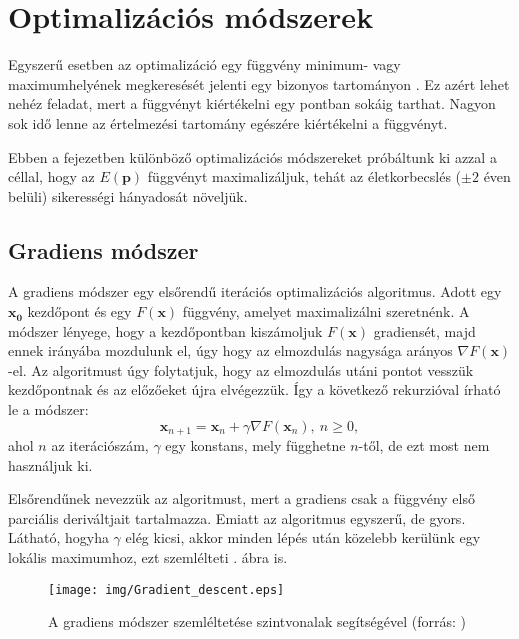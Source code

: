\documentclass[12pt]{article}
\begin{document}
\section{Optimalizációs módszerek}
Egyszerű esetben az optimalizáció egy függvény minimum- vagy maximumhelyének megkeresését jelenti egy bizonyos tartományon \cite{Holder}. Ez azért lehet nehéz feladat, mert a függvényt kiértékelni egy pontban sokáig tarthat. Nagyon sok idő lenne az értelmezési tartomány egészére kiértékelni a függvényt.

Ebben a fejezetben különböző optimalizációs módszereket próbáltunk ki azzal a céllal, hogy az $E(\mathbf{p})$ függvényt maximalizáljuk, tehát az életkorbecslés ($\pm 2$ éven belüli) sikerességi hányadosát növeljük.
\subsection{Gradiens módszer}
A gradiens módszer \cite{gradient1, gradient2} egy elsőrendű iterációs optimalizációs algoritmus. Adott egy $\mathbf{x_0}$ kezdőpont és egy $F(\mathbf{x})$ függvény, amelyet maximalizálni szeretnénk. A módszer lényege, hogy a kezdőpontban kiszámoljuk $F(\mathbf{x})$ gradiensét, majd ennek irányába mozdulunk el, úgy hogy az elmozdulás nagysága arányos $\nabla F(\mathbf{x})$-el.
Az algoritmust úgy folytatjuk, hogy az elmozdulás utáni pontot vesszük kezdőpontnak és az előzőeket újra elvégezzük.
Így a következő rekurzióval írható le a módszer:
\begin{equation}
	\mathbf {x}_{n+1}=\mathbf {x}_{n}+\gamma\nabla F(\mathbf {x}_{n}),\ n\geq 0,
\end{equation}
ahol $n$ az iterációszám, $\gamma$ egy konstans, mely függhetne $n$-től, de ezt most nem használjuk ki. 

Elsőrendűnek nevezzük az algoritmust, mert a gradiens csak a függvény első parciális deriváltjait tartalmazza. Emiatt az algoritmus egyszerű, de gyors. Látható, hogyha $\gamma$ elég kicsi, akkor minden lépés után közelebb kerülünk egy lokális maximumhoz, ezt szemlélteti . ábra is.
\begin{figure}[H]
	\centering
	\texttt{[image: img/Gradient\_descent.eps]}
	\caption{A gradiens módszer szemléltetése szintvonalak segítségével (forrás: \cite{grad_wiki})}
	\label{grad_contour}
\end{figure}
\end{document}
